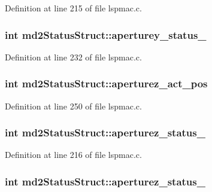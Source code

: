 Definition at line 215 of file lspmac.\-c.

\hypertarget{structmd2StatusStruct_a0a7738f13a0fa80626cafc2299b104b4}{
\subsubsection[{aperturey\-\_\-status\-\_\-2}]{\setlength{\rightskip}{0pt plus 5cm}int md2\-Status\-Struct\-::aperturey\-\_\-status\-\_}}\label{structmd2StatusStruct_a0a7738f13a0fa80626cafc2299b104b4}


Definition at line 232 of file lspmac.\-c.

\hypertarget{structmd2StatusStruct_a62d584ce23cfd9aa626d3c03649b455c}{
\subsubsection[{aperturez\-\_\-act\-\_\-pos}]{\setlength{\rightskip}{0pt plus 5cm}int md2\-Status\-Struct\-::aperturez\-\_\-act\-\_\-pos}}\label{structmd2StatusStruct_a62d584ce23cfd9aa626d3c03649b455c}


Definition at line 250 of file lspmac.\-c.

\hypertarget{structmd2StatusStruct_a27880dd795e1ba4fea4870c64ee3aa84}{
\subsubsection[{aperturez\-\_\-status\-\_\-1}]{\setlength{\rightskip}{0pt plus 5cm}int md2\-Status\-Struct\-::aperturez\-\_\-status\-\_}}\label{structmd2StatusStruct_a27880dd795e1ba4fea4870c64ee3aa84}


Definition at line 216 of file lspmac.\-c.

\hypertarget{structmd2StatusStruct_ae407a99e428d9f4a7444a02c8bc3414e}{
\subsubsection[{aperturez\-\_\-status\-\_\-2}]{\setlength{\rightskip}{0pt plus 5cm}int md2\-Status\-Struct\-::aperturez\-\_\-status\-\_}}\label{structmd2StatusStruct_ae407a99e428d9f4a7444a02c8bc3414e}


